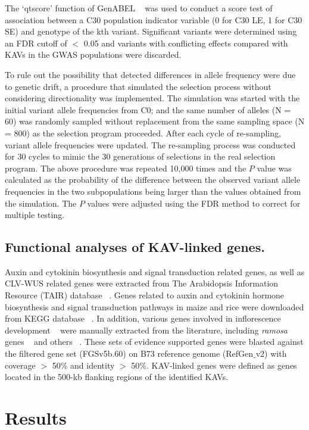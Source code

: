 \documentclass[10pt,letterpaper]{article}
\begin{document}
The ‘qtscore’ function of GenABEL ~\cite{Aulchenko2007} was used to conduct a score test of association between a C30 population indicator variable (0 for C30 LE, 1 for C30 SE) and genotype of the kth variant. Significant variants were determined using an FDR cutoff of $<$ 0.05 and variants with conflicting effects compared with KAVs in the GWAS populations were discarded.

To rule out the possibility that detected differences in allele frequency were due to genetic drift, a procedure that simulated the selection process without considering directionality was implemented. The simulation was started with the initial variant allele frequencies from C0; and the same number of alleles (N = 60) was randomly sampled without replacement from the same sampling space (N = 800) as the selection program proceeded. After each cycle of re-sampling, variant allele frequencies were updated. The re-sampling process was conducted for 30 cycles to mimic the 30 generations of selections in the real selection program. The above procedure was repeated 10,000 times and the $P$ value was calculated as the probability of the difference between the observed variant allele frequencies in the two subpopulations being larger than the values obtained from the simulation. The $P$ values were adjusted using the FDR method to correct for multiple testing. 

\subsection*{Functional analyses of KAV-linked genes.} 
Auxin and cytokinin biosynthesis and signal transduction related genes, as well as CLV-WUS related genes were extracted from The Arabidopsis Information Resource (TAIR) database ~\cite{Poole2007}. Genes related to auxin and cytokinin hormone biosynthesis and signal transduction pathways in maize and rice were downloaded from KEGG database ~\cite{Kanehisa2002}. In addition, various genes involved in inflorescence development ~\cite{Barazesh2008} were manually extracted from the literature, including \emph{ramosa} genes ~\cite{Bortiri2006} and others ~\cite{McSteen2001, Upadyayula2006, Xu2011}. These sets of evidence supported genes were blasted against the filtered gene set (FGSv5b.60) on B73 reference genome (RefGen$\_$v2) with coverage $>$ 50\% and identity $>$ 50\%. KAV-linked genes were defined as genes located in the 500-kb flanking regions of the identified KAVs.


\section*{Results}
\end{document}
